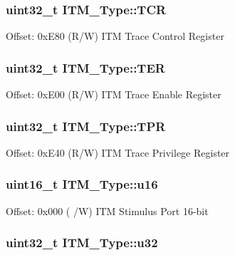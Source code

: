 \hypertarget{structITM__Type_a58f169e1aa40a9b8afb6296677c3bb45}{
\subsubsection[{T\-C\-R}]{ uint32\-\_\-t I\-T\-M\-\_\-\-Type\-::\-T\-C\-R}}\label{structITM__Type_a58f169e1aa40a9b8afb6296677c3bb45}
Offset\-: 0x\-E80 (R/\-W) I\-T\-M Trace Control Register \hypertarget{structITM__Type_a91a040e1b162e1128ac1e852b4a0e589}{
\subsubsection[{T\-E\-R}]{ uint32\-\_\-t I\-T\-M\-\_\-\-Type\-::\-T\-E\-R}}\label{structITM__Type_a91a040e1b162e1128ac1e852b4a0e589}
Offset\-: 0x\-E00 (R/\-W) I\-T\-M Trace Enable Register \hypertarget{structITM__Type_a93b480aac6da620bbb611212186d47fa}{
\subsubsection[{T\-P\-R}]{ uint32\-\_\-t I\-T\-M\-\_\-\-Type\-::\-T\-P\-R}}\label{structITM__Type_a93b480aac6da620bbb611212186d47fa}
Offset\-: 0x\-E40 (R/\-W) I\-T\-M Trace Privilege Register \hypertarget{structITM__Type_a12aa4eb4d9dcb589a5d953c836f4e8f4}{
\subsubsection[{u16}]{ uint16\-\_\-t I\-T\-M\-\_\-\-Type\-::u16}}\label{structITM__Type_a12aa4eb4d9dcb589a5d953c836f4e8f4}
Offset\-: 0x000 ( /\-W) I\-T\-M Stimulus Port 16-\/bit \hypertarget{structITM__Type_a6882fa5af67ef5c5dfb433b3b68939df}{
\subsubsection[{u32}]{ uint32\-\_\-t I\-T\-M\-\_\-\-Type\-::u32}}\label{structITM__Type_a6882fa5af67ef5c5dfb433b3b68939df}
